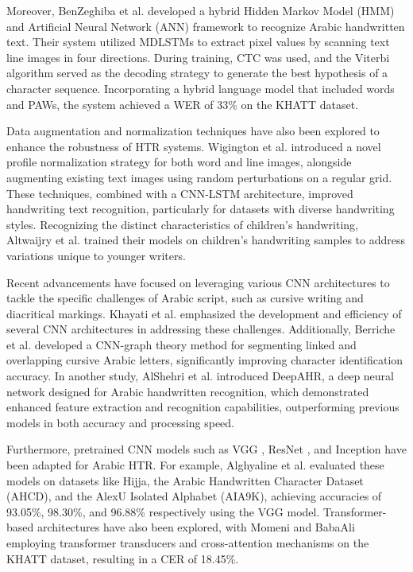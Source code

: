 \documentclass[conference]{IEEEtran}
\begin{document}
Moreover, BenZeghiba et al. \cite{benzeghiba2018hybrid} developed a hybrid Hidden Markov Model (HMM) and Artificial Neural Network (ANN) framework to recognize Arabic handwritten text. Their system utilized MDLSTMs to extract pixel values by scanning text line images in four directions. During training, CTC was used, and the Viterbi algorithm served as the decoding strategy to generate the best hypothesis of a character sequence. Incorporating a hybrid language model that included words and PAWs, the system achieved a WER of 33\% on the KHATT dataset.

Data augmentation and normalization techniques have also been explored to enhance the robustness of HTR systems. Wigington et al. \cite{wigington2020} introduced a novel profile normalization strategy for both word and line images, alongside augmenting existing text images using random perturbations on a regular grid. These techniques, combined with a CNN-LSTM architecture, improved handwriting text recognition, particularly for datasets with diverse handwriting styles. Recognizing the distinct characteristics of children's handwriting, Altwaijry et al. \cite{altwaijry2021arabic} trained their models on children's handwriting samples to address variations unique to younger writers.


Recent advancements have focused on leveraging various CNN architectures to tackle the specific challenges of Arabic script, such as cursive writing and diacritical markings. Khayati et al. \cite{khayati2021} emphasized the development and efficiency of several CNN architectures in addressing these challenges. Additionally, Berriche et al. \cite{berriche2024hybrid} developed a CNN-graph theory method for segmenting linked and overlapping cursive Arabic letters, significantly improving character identification accuracy. In another study, AlShehri et al. \cite{alshehri2022} introduced DeepAHR, a deep neural network designed for Arabic handwritten recognition, which demonstrated enhanced feature extraction and recognition capabilities, outperforming previous models in both accuracy and processing speed.

Furthermore, pretrained CNN models such as VGG \cite{}, ResNet \cite{}, and Inception \cite{} have been adapted for Arabic HTR. For example, Alghyaline et al. \cite{alghyaline2023} evaluated these models on datasets like Hijja, the Arabic Handwritten Character Dataset (AHCD), and the AlexU Isolated Alphabet (AIA9K), achieving accuracies of 93.05\%, 98.30\%, and 96.88\% respectively using the VGG model. Transformer-based architectures have also been explored, with Momeni and BabaAli \cite{momeni2023} employing transformer transducers and cross-attention mechanisms on the KHATT dataset, resulting in a CER of 18.45\%.
\end{document}
